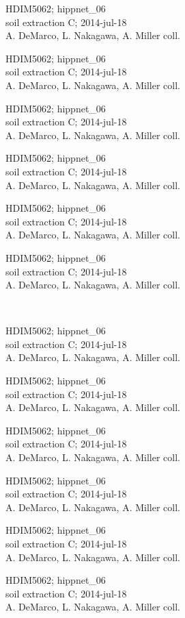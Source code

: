\documentclass[2pt]{extarticle}
\begin{document}
\noindent
\parbox{0.16\textwidth}{\tiny \raggedright \rule[-0.3\baselineskip]{0pt}{10pt}HDIM5062; hippnet\_06\\ soil extraction C; 2014-jul-18\\ A. DeMarco, L. Nakagawa, A. Miller coll.}
\parbox{0.16\textwidth}{\tiny \raggedright \rule[-0.3\baselineskip]{0pt}{10pt}HDIM5062; hippnet\_06\\ soil extraction C; 2014-jul-18\\ A. DeMarco, L. Nakagawa, A. Miller coll.}
\parbox{0.16\textwidth}{\tiny \raggedright \rule[-0.3\baselineskip]{0pt}{10pt}HDIM5062; hippnet\_06\\ soil extraction C; 2014-jul-18\\ A. DeMarco, L. Nakagawa, A. Miller coll.}
\parbox{0.16\textwidth}{\tiny \raggedright \rule[-0.3\baselineskip]{0pt}{10pt}HDIM5062; hippnet\_06\\ soil extraction C; 2014-jul-18\\ A. DeMarco, L. Nakagawa, A. Miller coll.}
\parbox{0.16\textwidth}{\tiny \raggedright \rule[-0.3\baselineskip]{0pt}{10pt}HDIM5062; hippnet\_06\\ soil extraction C; 2014-jul-18\\ A. DeMarco, L. Nakagawa, A. Miller coll.}
\parbox{0.16\textwidth}{\tiny \raggedright \rule[-0.3\baselineskip]{0pt}{10pt}HDIM5062; hippnet\_06\\ soil extraction C; 2014-jul-18\\ A. DeMarco, L. Nakagawa, A. Miller coll.} \\ 
\vspace{0.001in} 

\noindent
\parbox{0.16\textwidth}{\tiny \raggedright \rule[-0.3\baselineskip]{0pt}{10pt}HDIM5062; hippnet\_06\\ soil extraction C; 2014-jul-18\\ A. DeMarco, L. Nakagawa, A. Miller coll.}
\parbox{0.16\textwidth}{\tiny \raggedright \rule[-0.3\baselineskip]{0pt}{10pt}HDIM5062; hippnet\_06\\ soil extraction C; 2014-jul-18\\ A. DeMarco, L. Nakagawa, A. Miller coll.}
\parbox{0.16\textwidth}{\tiny \raggedright \rule[-0.3\baselineskip]{0pt}{10pt}HDIM5062; hippnet\_06\\ soil extraction C; 2014-jul-18\\ A. DeMarco, L. Nakagawa, A. Miller coll.}
\parbox{0.16\textwidth}{\tiny \raggedright \rule[-0.3\baselineskip]{0pt}{10pt}HDIM5062; hippnet\_06\\ soil extraction C; 2014-jul-18\\ A. DeMarco, L. Nakagawa, A. Miller coll.}
\parbox{0.16\textwidth}{\tiny \raggedright \rule[-0.3\baselineskip]{0pt}{10pt}HDIM5062; hippnet\_06\\ soil extraction C; 2014-jul-18\\ A. DeMarco, L. Nakagawa, A. Miller coll.}
\parbox{0.16\textwidth}{\tiny \raggedright \rule[-0.3\baselineskip]{0pt}{10pt}HDIM5062; hippnet\_06\\ soil extraction C; 2014-jul-18\\ A. DeMarco, L. Nakagawa, A. Miller coll.} \\ 
\vspace{0.001in} 
\end{document}
